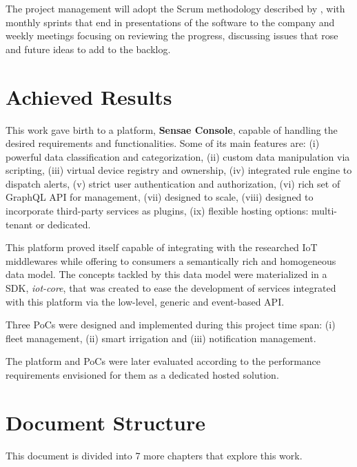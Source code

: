 The project management will adopt the Scrum methodology described by \cite{schwaber1997scrum}, with monthly sprints that end in presentations of the software to the company and weekly meetings focusing on reviewing the progress, discussing issues that rose and future ideas to add to the backlog.

\section{Achieved Results}
\label{sec:introduction:achieved_results}

This work gave birth to a platform, \textbf{Sensae Console}, capable of handling the desired requirements and functionalities. Some of its main features are: (i) powerful data classification and categorization, (ii) custom data manipulation via scripting, (iii) virtual device registry and ownership, (iv) integrated rule engine to dispatch alerts, (v) strict user authentication and authorization, (vi) rich set of GraphQL \gls{API} for management, (vii) designed to scale, (viii) designed to incorporate third-party services as plugins, (ix) flexible hosting options: multi-tenant or dedicated.

This platform proved itself capable of integrating with the researched \gls{IoT} middlewares while offering to consumers a semantically rich and homogeneous data model. The concepts tackled by this data model were materialized in a \gls{SDK}, \textit{iot-core}, that was created to ease the development of services integrated with this platform via the low-level, generic and event-based \gls{API}.

Three \gls{PoC}s were designed and implemented during this project time span: (i) fleet management, (ii) smart irrigation and (iii) notification management.

The platform and \gls{PoC}s were later evaluated according to the performance requirements envisioned for them as a dedicated hosted solution.

\section{Document Structure}
\label{sec:introduction:document_structure}

This document is divided into 7 more chapters that explore this work.

